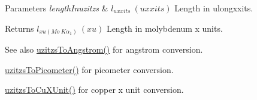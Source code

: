 \begin{DoxyParams}{Parameters}
{\em length\+Inuzitzs} & $ l_{uxxits}\ (uxxits)$ Length in ulongxxits. \\
\hline
\end{DoxyParams}
\begin{DoxyReturn}{Returns}
$ l_{xu(Mo\ K\alpha_1)}\ (xu)$ Length in molybdenum x units. 
\end{DoxyReturn}
\begin{DoxySeeAlso}{See also}
\mbox{\hyperlink{group___e_g_x_math-_conversions-_length_conversions-uzitzs-_non-_s_i_gaaaecee65b1db5abcc71e18526e7073eb}{uzitzs\+To\+Angstrom()}} for angstrom conversion. 

\mbox{\hyperlink{group___e_g_x_math-_conversions-_length_conversions-uzitzs-_s_i_ga48c60a4876ac426d1717096263648a4d}{uzitzs\+To\+Picometer()}} for picometer conversion. 

\mbox{\hyperlink{group___e_g_x_math-_conversions-_length_conversions-uzitzs-_non-_s_i_gab25470e41b88c41d4bf32622baa6c472}{uzitzs\+To\+Cu\+X\+Unit()}} for copper x unit conversion. 
\end{DoxySeeAlso}
